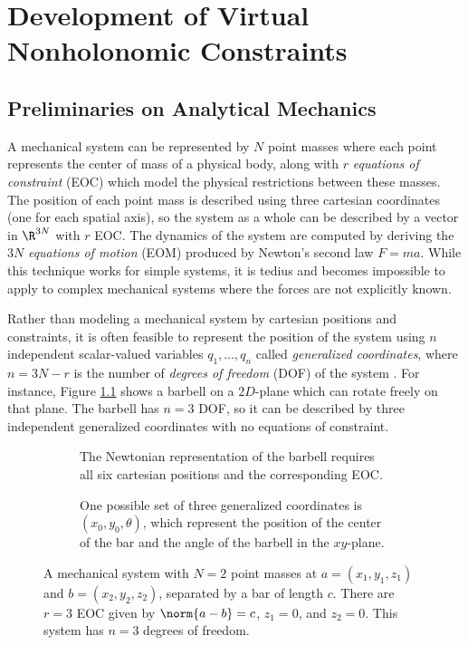 

\chapter{Development of Virtual Nonholonomic Constraints}\label{ch:vnhcs}

\section{Preliminaries on Analytical Mechanics}
A mechanical system can be represented by \(N\) point masses where each point
represents the center of mass of a physical body, along with \(r\)
\textit{equations of constraint} (EOC) which model the physical restrictions
between these masses.
The position of each point mass is described using three cartesian coordinates (one
for each spatial axis), so the system as a whole can be described by a vector in
\(\R^{3N}\) with \(r\) EOC. 
The dynamics of the system are computed by deriving the \(3N\)
\textit{equations of motion} (EOM) produced by Newton's second law \(F = m a\).
While this technique works for simple systems, it is tedius and becomes
impossible to apply to complex mechanical systems where the forces are not
explicitly known. 

Rather than modeling a mechanical system by cartesian positions and constraints,
it is often feasible to represent the position of the system using \(n\)
independent scalar-valued variables \(q_1,\ldots,q_n\) called 
\textit{generalized coordinates}, where \(n = 3N - r\) is the number of
\textit{degrees of freedom} (DOF) of the system \cite{greenwood_dynamics}. For
instance, Figure \ref{fig:barbell} shows a barbell on a \(2D\)-plane which can
rotate freely on that plane. 
The barbell has \(n = 3\) DOF, so it can be described by three
independent generalized coordinates with no equations of constraint.

\begin{figure}
   \centering
   \begin{subfigure}[]{0.75\textwidth}
      
      \caption{The Newtonian representation of the barbell 
      requires all six cartesian positions and the corresponding EOC.}
   \end{subfigure}
   \begin{subfigure}[]{0.75\textwidth}
      
      \caption{One possible set of three generalized coordinates is
       \((x_0,y_0,\theta)\), which represent the position of the 
       center of the bar and the angle of the barbell in the \(xy\)-plane.}
   \end{subfigure}
   \caption{A mechanical system with \(N = 2\) point masses at \(a = (x_1,y_1,z_1)\)
       and \(b = (x_2,y_2,z_2)\), separated by a bar of length \(c\). 
       There are \(r = 3\) EOC given by \(\norm{a - b} = c\), \(z_1 = 0\),
       and \(z_2 = 0\). This system has \(n = 3\) degrees of freedom.}
   \label{fig:barbell}
\end{figure}

